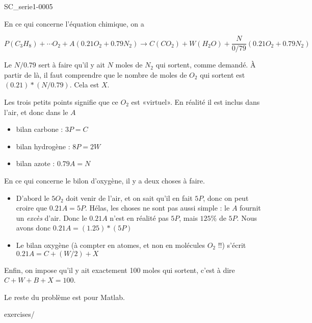 \begin{corrige}{SC_serie1-0005}

	En ce qui concerne l'équation chimique, on a

	\begin{equation}
		P(C_3H_8) + \cdots O_2 + A(0.21 O_2 + 0.79 N_2) \to C (CO_2) + W(H_2O) + \frac{ N }{ 0/79 } (0.21 O_2 + 0.79 N_2)
	\end{equation}

Le $N/0.79$ sert à faire qu'il y ait $N$ moles de $N_2$ qui sortent, comme demandé. À partir de là, il faut comprendre que le nombre de moles de $O_2$ qui sortent est $(0.21)*(N/0.79)$. Cela est $X$.

 Les trois petits points signifie que ce $O_2$ est «virtuel». En réalité il est inclus dans l'air, et donc dans le $A$

\begin{itemize}
	\item 
bilan carbone : $3P = C$
\item
 bilan hydrogène : $8P = 2W$
 \item
 bilan azote : $0.79 A = N$
\end{itemize}

En ce qui concerne le bilon d'oxygène, il y a deux choses à faire.
\begin{itemize}
	\item  D'abord le $5O_2$ doit venir de l'air, et on sait qu'il en fait $5P$, donc on peut croire que $0.21A = 5P$. Hélas, les choses ne sont pas aussi simple : le $A$ fournit un \emph{excès} d'air. Donc le $0.21A$ n'est en réalité pas $5P$, mais $125\%$ de $5P$. Nous avons donc $0.21A = (1.25)*(5P)$
	\item Le bilan oxygène (à compter en atomes, et non en molécules $O_2$ !!) s'écrit $0.21 A = C+(W/2)+X$
\end{itemize}
Enfin, on impose qu'il y ait exactement 100 moles qui sortent, c'est à dire $C+W+B+X=100$.

Le reste du problème est pour Matlab.

exercises/

\end{corrige}
